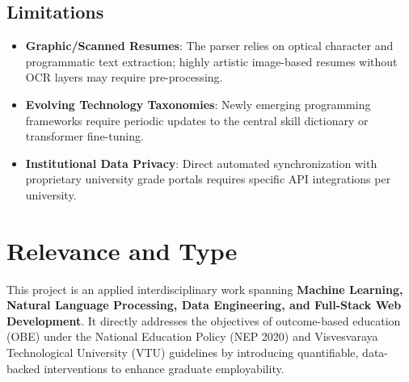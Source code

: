 \documentclass[12pt,a4paper]{report}
\begin{document}
\subsection{Limitations}
\begin{itemize}
    \item \textbf{Graphic/Scanned Resumes}: The parser relies on optical character and programmatic text extraction; highly artistic image-based resumes without OCR layers may require pre-processing.
    \item \textbf{Evolving Technology Taxonomies}: Newly emerging programming frameworks require periodic updates to the central skill dictionary or transformer fine-tuning.
    \item \textbf{Institutional Data Privacy}: Direct automated synchronization with proprietary university grade portals requires specific API integrations per university.
\end{itemize}

\section{Relevance and Type}
This project is an applied interdisciplinary work spanning \textbf{Machine Learning, Natural Language Processing, Data Engineering, and Full-Stack Web Development}. It directly addresses the objectives of outcome-based education (OBE) under the National Education Policy (NEP 2020) and Visvesvaraya Technological University (VTU) guidelines by introducing quantifiable, data-backed interventions to enhance graduate employability.
\end{document}
